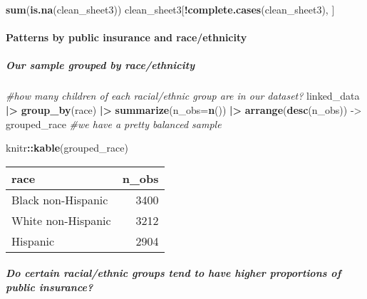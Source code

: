 \documentclass[
]{article}
\newenvironment{Shaded}{\begin{snugshade}}{\end{snugshade}}
\newcommand{\AttributeTok}[1]{\textcolor[rgb]{0.13,0.29,0.53}{#1}}
\newcommand{\CommentTok}[1]{\textcolor[rgb]{0.56,0.35,0.01}{\textit{#1}}}
\newcommand{\FunctionTok}[1]{\textcolor[rgb]{0.13,0.29,0.53}{\textbf{#1}}}
\newcommand{\NormalTok}[1]{#1}
\newcommand{\OtherTok}[1]{\textcolor[rgb]{0.56,0.35,0.01}{#1}}
\newcommand{\SpecialCharTok}[1]{\textcolor[rgb]{0.81,0.36,0.00}{\textbf{#1}}}
\begin{document}
\begin{Shaded}
\begin{Highlighting}[]
\FunctionTok{sum}\NormalTok{(}\FunctionTok{is.na}\NormalTok{(clean\_sheet3))}
\NormalTok{clean\_sheet3[}\SpecialCharTok{!}\FunctionTok{complete.cases}\NormalTok{(clean\_sheet3), ]}
\end{Highlighting}
\end{Shaded}

\hypertarget{patterns-by-public-insurance-and-raceethnicity}{%
\paragraph{Patterns by public insurance and
race/ethnicity}\label{patterns-by-public-insurance-and-raceethnicity}}

\hypertarget{our-sample-grouped-by-raceethnicity}{%
\subparagraph{Our sample grouped by
race/ethnicity}\label{our-sample-grouped-by-raceethnicity}}

\begin{Shaded}
\begin{Highlighting}[]
\CommentTok{\#how many children of each racial/ethnic group are in our dataset?}
\NormalTok{linked\_data }\SpecialCharTok{|\textgreater{}}
  \FunctionTok{group\_by}\NormalTok{(race) }\SpecialCharTok{|\textgreater{}}
  \FunctionTok{summarize}\NormalTok{(}\AttributeTok{n\_obs=}\FunctionTok{n}\NormalTok{()) }\SpecialCharTok{|\textgreater{}}
    \FunctionTok{arrange}\NormalTok{(}\FunctionTok{desc}\NormalTok{(n\_obs)) }\OtherTok{{-}\textgreater{}}\NormalTok{ grouped\_race }\CommentTok{\#we have a pretty balanced sample}

\NormalTok{knitr}\SpecialCharTok{::}\FunctionTok{kable}\NormalTok{(grouped\_race)}
\end{Highlighting}
\end{Shaded}

\begin{longtable}[]{@{}lr@{}}
\toprule\noalign{}
race & n\_obs \\
\midrule\noalign{}
\endhead
\bottomrule\noalign{}
\endlastfoot
Black non-Hispanic & 3400 \\
White non-Hispanic & 3212 \\
Hispanic & 2904 \\
\end{longtable}

\hypertarget{do-certain-racialethnic-groups-tend-to-have-higher-proportions-of-public-insurance}{%
\subparagraph{Do certain racial/ethnic groups tend to have higher
proportions of public
insurance?}\label{do-certain-racialethnic-groups-tend-to-have-higher-proportions-of-public-insurance}}
\end{document}
